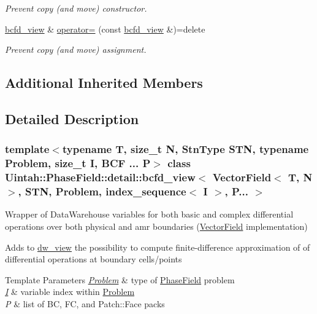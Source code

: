 \begin{DoxyCompactItemize}
\begin{DoxyCompactList}\small\item\em Prevent copy (and move) constructor. \end{DoxyCompactList}\item 
\hyperlink{classUintah_1_1PhaseField_1_1detail_1_1bcfd__view}{bcfd\+\_\+view} \& \hyperlink{classUintah_1_1PhaseField_1_1detail_1_1bcfd__view_3_01VectorField_3_01T_00_01N_01_4_00_01STN_00_1a8b5a6da126f9f6f13d940aa745f239_a85279cdc6a38b63bdcfae93ee3ce8a9c}{operator=} (const \hyperlink{classUintah_1_1PhaseField_1_1detail_1_1bcfd__view}{bcfd\+\_\+view} \&)=delete
\begin{DoxyCompactList}\small\item\em Prevent copy (and move) assignment. \end{DoxyCompactList}\end{DoxyCompactItemize}
\subsection*{Additional Inherited Members}


\subsection{Detailed Description}
\subsubsection*{template$<$typename T, size\+\_\+t N, Stn\+Type S\+TN, typename Problem, size\+\_\+t I, B\+C\+F ... P$>$\newline
class Uintah\+::\+Phase\+Field\+::detail\+::bcfd\+\_\+view$<$ Vector\+Field$<$ T, N $>$, S\+T\+N, Problem, index\+\_\+sequence$<$ I $>$, P... $>$}

Wrapper of Data\+Warehouse variables for both basic and complex differential operations over both physical and amr boundaries (\hyperlink{structUintah_1_1PhaseField_1_1VectorField}{Vector\+Field} implementation) 

Adds to \hyperlink{classUintah_1_1PhaseField_1_1detail_1_1dw__view}{dw\+\_\+view} the possibility to compute finite-\/difference approximation of of differential operations at boundary cells/points


\begin{DoxyTemplParams}{Template Parameters}
{\em \hyperlink{classUintah_1_1PhaseField_1_1Problem}{Problem}} & type of \hyperlink{namespaceUintah_1_1PhaseField}{Phase\+Field} problem \\
\hline
{\em \hyperlink{structUintah_1_1PhaseField_1_1I}{I}} & variable index within \hyperlink{classUintah_1_1PhaseField_1_1Problem}{Problem} \\
\hline
{\em P} & list of BC, FC, and Patch\+::\+Face packs \\
\hline
\end{DoxyTemplParams}


